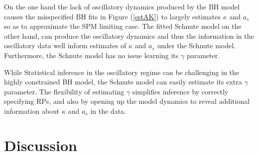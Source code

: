 %
On the one hand the lack of oscillatory dynamics produced by the BH model causes the misspecified
BH fits in Figure (\ref{estAK}) to largely estimates $\kappa$ and $a_s$ so as to
approximate the SPM limiting case. The fitted Schnute model on the other hand, can 
produce the oscillatory dynamics and thus the information in the oscillatory data
well inform estimates of $\kappa$ and $a_s$ under the Schnute model. Furthermore,
the Schnute model has no issue learning its $\gamma$ parameter.

%
While Statistical inference in the oscillatory regime can be challenging in
the highly constrained BH model, the Schnute model can easily estimate its extra
$\gamma$ parameter. The flexibility of estimating $\gamma$ simplifies inference by 
correctly specifying RPs, and also by opening up the model dynamics to reveal
additional information about $\kappa$ and $a_s$ in the data. %



\section{Discussion}


